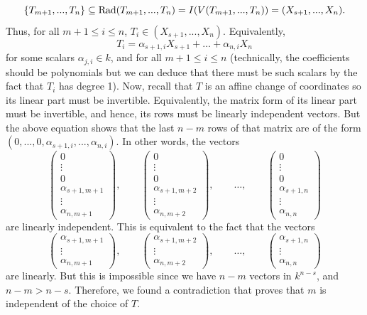 \begin{solution}
\begin{enumerate}[label=(\alph*)]
        $$\{T_{m+1}, ..., T_n\} \subseteq \operatorname{Rad}(T_{m+1}, ..., T_n) = I(V(T_{m+1}, ..., T_n)) = (X_{s+1}, ..., X_n).$$
        Thus, for all $m+1 \leq i \leq n$, $T_i \in (X_{s+1}, ..., X_n)$. Equivalently, 
        $$T_i = \alpha_{s+1, i}X_{s+1} + \dots + \alpha_{n,i}X_n$$
        for some scalars $\alpha_{j,i} \in k$, and for all $m+1 \leq i \leq n$ (technically, the coefficients should be polynomials but we can deduce that there must be such scalars by the fact that $T_i$ has degree 1). Now, recall that $T$ is an affine change of coordinates so its linear part must be invertible. Equivalently, the matrix form of its linear part must be invertible, and hence, its rows must be linearly independent vectors. But the above equation shows that the last $n -m$ rows of that matrix are of the form $(0,..., 0, \alpha_{s+1,i}, ..., \alpha_{n,i})$. In other words, the vectors
        $$\begin{pmatrix}
            0 \\ \vdots \\ 0 \\ \alpha_{s+1,m+1} \\ \vdots \\ \alpha_{n,m+1}
        \end{pmatrix}, \qquad \begin{pmatrix}
            0 \\ \vdots \\ 0 \\ \alpha_{s+1,m+2} \\ \vdots \\ \alpha_{n,m+2}
        \end{pmatrix}, \qquad \dots, \qquad \begin{pmatrix}
            0 \\ \vdots \\ 0 \\ \alpha_{s+1,n} \\ \vdots \\ \alpha_{n,n}
        \end{pmatrix}$$
        are linearly independent. This is equivalent to the fact that the vectors
        $$\begin{pmatrix}
            \alpha_{s+1,m+1} \\ \vdots \\ \alpha_{n,m+1}
        \end{pmatrix}, \qquad \begin{pmatrix}
            \alpha_{s+1,m+2} \\ \vdots \\ \alpha_{n,m+2}
        \end{pmatrix}, \qquad \dots, \qquad \begin{pmatrix}
            \alpha_{s+1,n} \\ \vdots \\ \alpha_{n,n}
        \end{pmatrix}$$
        are linearly. But this is impossible since we have $n - m$ vectors in $k^{n - s}$, and $n - m > n-s$. Therefore, we found a contradiction that proves that $m$ is independent of the choice of $T$.
        

\end{enumerate}
\end{solution}

